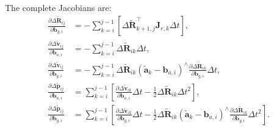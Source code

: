 The complete Jacobians are:
\begin{subequations}\label{eq:preinteg-jacob-bias}
	\begin{align}
		\frac{\partial \Delta \tilde{\bm{R}}_{ij}}{\partial \bm{b}_{g,i}} &= -\sum_{k=i}^{j-1} \left[\Delta 
		\tilde{\bm{R}}_{k+1, j}^\top \bm{J}_{r,k} \Delta t \right], \\
		\frac{\partial \Delta \tilde{\bm{v}}_{ij}}{\partial \bm{b}_{a,i}} &= -\sum_{k=i}^{j-1} \Delta 
		\tilde{\bm{R}}_{ik} \Delta t, \\
		\frac{\partial \Delta \tilde{\bm{v}}_{ij}}{\partial \bm{b}_{g,i}} &= -\sum_{k=i}^{j-1} \Delta 
		\tilde{\bm{R}}_{ik} \left( \tilde{\bm{a}}_k - \bm{b}_{a,i} \right)^\wedge \frac{\partial \Delta 
			\tilde{\bm{R}}_{ik}}{\partial \bm{b}_{g,i}} \Delta t, \\
		\frac{\partial \Delta \tilde{\bm{p}}_{ij}}{\partial \bm{b}_{a,i}} &= \sum_{k=i}^{j-1} \left[\frac{\partial 
			\Delta \tilde{\bm{v}}_{ik}}{\partial \bm{b}_{a,i}}  \Delta t - \frac{1}{2} \Delta \tilde{\bm{R}}_{ik} \Delta t^2 
		\right], \\
		\frac{\partial \Delta \tilde{\bm{p}}_{ij}}{\partial \bm{b}_{g,i}} &= \sum_{k=i}^{j-1} \left[\frac{\partial 
			\Delta \tilde{\bm{v}}_{ik}}{\partial \bm{b}_{g,i}} \Delta t -\frac{1}{2} \Delta 
		\tilde{\bm{R}}_{ik}\left(\tilde{\bm{a}}_{k}-\bm{b}_{a,i}\right)^\wedge  \frac{\partial \Delta 
			\tilde{\bm{R}}_{ik}}{\partial \bm{b}_{g,i}} \Delta t^2 \right]. 
	\end{align}
\end{subequations}

